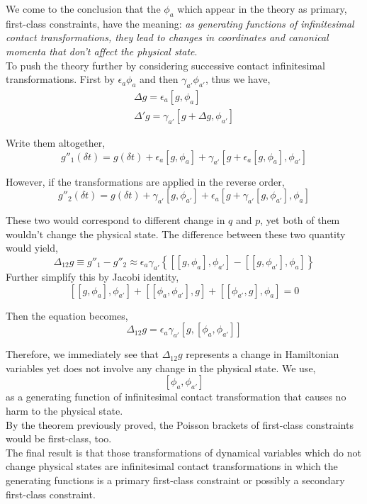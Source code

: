 \documentclass[12pt]{article}
\numberwithin{equation}{section}
\begin{document}
We come to the conclusion that the $\phi_a$ which appear in the theory as primary, first-class constraints, have the meaning:
\textit{as generating functions of infinitesimal contact transformations, they lead to changes in coordinates and canonical momenta that don't affect the physical state}.
\\\indent  To push the theory further by considering successive contact infinitesimal transformations.
First by $\epsilon_a\phi_a$ and then $\gamma_{a'}\phi_{a'}$, thus we have,
\begin{equation}
    \begin{split}
        \Delta g = \epsilon_a\left[g, \phi_a\right]\\
        \Delta' g = \gamma_{a'}\left[g+\Delta g, \phi_{a'}\right]
    \end{split}
\end{equation}

Write them altogether,
\begin{equation}
    g''_1(\delta t) = g(\delta t) + \epsilon_a\left[g, \phi_a\right] + \gamma_{a'}\left[g+\epsilon_a\left[g, \phi_a\right], \phi_{a'}\right]
\end{equation}

However, if the transformations are applied in the reverse order, 
\begin{equation}
    g''_2(\delta t) = g(\delta t) + \gamma_{a'}\left[g, \phi_{a'}\right] + \epsilon_{a}\left[g+\gamma_{a'}\left[g, \phi_{a'}\right], \phi_a\right]
\end{equation}

These two would correspond to different change in $q$ and $p$, yet both of them wouldn't change the physical state.
The difference between these two quantity would yield,
\[\Delta_{12}g\equiv g''_1 - g''_2 \approx \epsilon_a\gamma_{a'}\left\{\left[\left[g, \phi_a\right], \phi_{a'}\right] - \left[\left[g, \phi_{a'}\right], \phi_a\right]\right\}\]
Further simplify this by Jacobi identity, 
\[\left[\left[g, \phi_a\right], \phi_{a'}\right] + \left[\left[\phi_a, \phi_{a'}\right], g\right] + \left[\left[\phi_{a'}, g\right], \phi_a\right] = 0 \]

Then the equation becomes,
\begin{equation}
    \Delta_{12}g = \epsilon_a\gamma_{a'}\left[g, \left[\phi_a, \phi_{a'}\right]\right]
\end{equation}

Therefore, we immediately see that $\Delta_{12}g$ represents a change in Hamiltonian variables yet does not involve any change in the physical state.
We use,
\begin{equation}
    \left[\phi_a, \phi_{a'}\right]
\end{equation}
as a generating function of infinitesimal contact transformation that causes no harm to the physical state.
\\\indent By the theorem previously proved, the Poisson brackets of first-class constraints would be first-class, too.
\\\indent The final result is that those transformations of dynamical variables which do not change physical states are infinitesimal contact transformations in which the generating functions is a primary first-class constraint or possibly a secondary first-class constraint.
\end{document}
